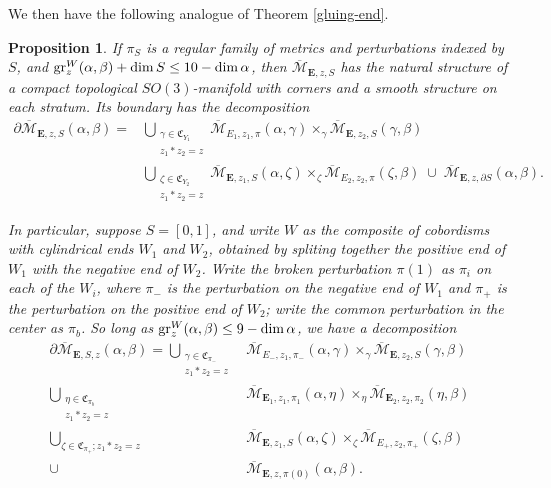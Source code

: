 \documentclass[10pt,a4paper]{amsart}
\newtheorem{proposition}[theorem]{Proposition}
\theoremstyle{definition}
\theoremstyle{remark}
\numberwithin{figure}{qchap}
\begin{document}
We then have the following analogue of Theorem \ref{gluing-end}.

\begin{proposition}\label{famgluing}If $\pi_S$ is a regular family of metrics and perturbations indexed by $S$, and $\textup{gr}^W_z(\alpha, \beta) + \dim S \leq 10 - \dim \alpha$, then $\overline{\mathcal M}_{\mathbf{E},z,S}$ has the natural structure of a compact topological $SO(3)$-manifold with corners and a smooth structure on each stratum. Its boundary has the decomposition
\begin{align*}\partial \overline{\mathcal M}_{\mathbf{E},z,S}(\alpha, \beta) = &\bigcup_{\substack{\gamma \in \mathfrak C_{Y_1}\\ z_1 * z_2 = z}}\overline{\mathcal M}_{E_1,z_1,\pi}(\alpha, \gamma) \times_\gamma \overline{\mathcal M}_{\mathbf{E},z_2,S}(\gamma, \beta)\\ &\bigcup_{\substack{\zeta \in \mathfrak C_{Y_2} \\ z_1 * z_2 = z}} \overline{\mathcal M}_{\mathbf{E},z_1,S}(\alpha, \zeta) \times_\zeta \overline{\mathcal M}_{E_2,z_2,\pi}(\zeta, \beta) \;\cup \; \overline{\mathcal M}_{\mathbf{E},z,\partial S}(\alpha, \beta).
\end{align*}

In particular, suppose $S = [0,1]$, and write $W$ as the composite of cobordisms with cylindrical ends $W_1$ and $W_2$, obtained by spliting together the positive end of $W_1$ with the negative end of $W_2$. Write the broken perturbation $\pi(1)$ as $\pi_i$ on each of the $W_i$, where $\pi_-$ is the perturbation on the negative end of $W_1$ and $\pi_+$ is the perturbation on the positive end of $W_2$; write the common perturbation in the center as $\pi_b$. So long as $\textup{gr}_z^W(\alpha, \beta) \leq 9-\dim \alpha$, we have a decomposition
\begin{align*}\partial \overline{\mathcal M}_{\mathbf E,S,z}(\alpha, \beta) = \bigcup_{\substack{\gamma \in \mathfrak C_{\pi_-}\\ z_1 \ast z_2 = z}} &\overline{\mathcal M}_{E_-,z_1,\pi_-}(\alpha, \gamma) \times_\gamma \overline{\mathcal M}_{\mathbf{E},z_2,S}(\gamma, \beta)\\
\bigcup_{\substack{\eta \in \mathfrak C_{\pi_b}\\ z_1 \ast z_2 = z}} &\overline{\mathcal M}_{\mathbf{E}_1,z_1,\pi_1}(\alpha, \eta) \times_\eta \overline{\mathcal M}_{\mathbf{E}_2,z_2,\pi_2}(\eta, \beta)\\
\bigcup_{\zeta \in \mathfrak C_{\pi_+}; z_1 \ast z_2 = z} &\overline{\mathcal M}_{\mathbf{E},z_1,S}(\alpha, \zeta) \times_\zeta \overline{\mathcal M}_{E_+,z_2,\pi_+}(\zeta, \beta)\\
\cup \; \; \; \; &\overline{\mathcal M}_{\mathbf{E},z,\pi(0)}(\alpha, \beta).\\
\end{align*}
\end{proposition}
\end{document}
